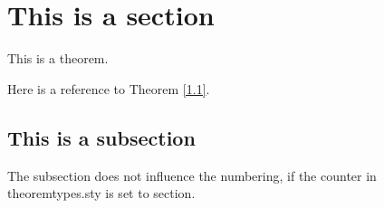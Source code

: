 \documentclass{article}
\begin{document}
    \section{This is a section}
        \begin{theorem}
            This is a theorem.
        \end{theorem}
        \begin{theorem*}[Reference]
            Here is a reference to  Theorem \ref{1.1}.
        \end{theorem*}
    \subsection{This is a subsection}
        \begin{lemma}[Numbering]
            The subsection does not influence the numbering, if the counter in theoremtypes.sty is set to section.
        \end{lemma}
\end{document}
